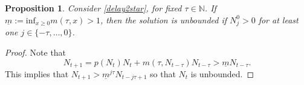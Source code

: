 \documentclass{article}
\numberwithin{theorem}{section}
\newtheorem{proposition}[theorem]{Proposition}
\begin{document}
\begin{proposition}\label{Propbound}
    Consider \eqref{delay2star}, for fixed $\tau\in \mathbb{N}$.  If $\underline{m}:=\mbox{inf}_{x\geq 0}m(\tau, x)>1$, then the solution is unbounded if $N_j^0>0$ for at least one $j\in \{-\tau, \ldots, 0\}$.
\end{proposition}



\begin{proof}
Note that 
$$N_{t+1}=p(N_t)N_t + m(\tau, N_{t-\tau}) N_{t-\tau}>\underline{m} N_{t-\tau}.$$
This implies that $N_{t+1}>\underline{m}^{j\tau}N_{t-j\tau+1}$ so that  $N_t$ is unbounded.
\end{proof}


\end{document}
